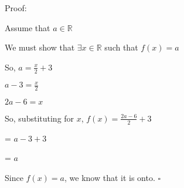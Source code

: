 \documentclass{article} %
\begin{document}
    Proof:

    Assume that $a \in \mathbb{R}$
    
    We must show that $\exists x \in \mathbb{R}$ such that $f(x) = a$

    So, $a = \frac{x}{2} + 3$

    \tabto{1cm} $a-3 = \frac{x}{2}$

    \tabto{1cm} $2a - 6 = x$

    So, substituting for $x$, $f(x) = \frac{2a - 6}{2} + 3$

    \tabto{4.82cm} = $a - 3 + 3$

    \tabto{4.82cm} = $a$

    Since $f(x) = a$, we know that it is onto. $\square$



    
\end{document}
